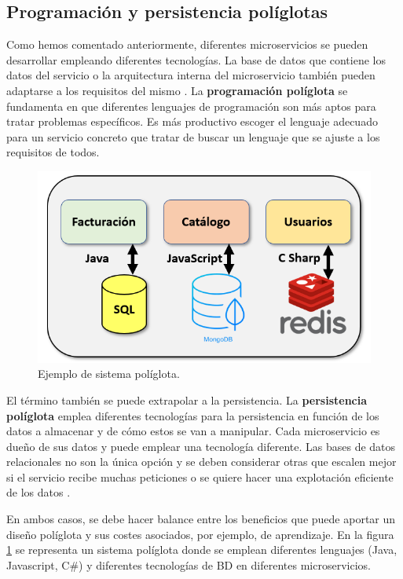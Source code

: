 \documentclass[11pt,spanish,listoffigures]{tfgetsinf}
\begin{document}
\subsection{Programación y persistencia políglotas} \label{subsec:Poliglota}

Como hemos comentado anteriormente, diferentes microservicios se pueden desarrollar empleando diferentes tecnologías. La base de datos que contiene los datos del servicio o la arquitectura interna del microservicio también pueden adaptarse a los requisitos del mismo \cite{DelaTorre2018}. La \textbf{programación políglota} se fundamenta en que diferentes lenguajes de programación son más aptos para tratar problemas específicos. Es más productivo escoger el lenguaje adecuado para un servicio concreto que tratar de buscar un lenguaje que se ajuste a los requisitos de todos.

\begin{figure}[h]
\centering
\includegraphics[scale=0.65]{poliglota}
\caption{Ejemplo de sistema políglota.}
\label{fig:poliglota}
\end{figure}

El término también se puede extrapolar a la persistencia. La \textbf{persistencia políglota} emplea diferentes tecnologías para la persistencia en función de los datos a almacenar y de cómo estos se van a manipular. Cada microservicio es dueño de sus datos y puede emplear una tecnología diferente. Las bases de datos relacionales no son la única opción y se deben considerar otras que escalen mejor si el servicio recibe muchas peticiones o se quiere hacer una explotación eficiente de los datos \cite{Fowler2011}.

En ambos casos, se debe hacer balance entre los beneficios que puede aportar un diseño políglota y sus costes asociados, por ejemplo, de aprendizaje. En la figura \ref{fig:poliglota} se representa un sistema políglota donde se emplean diferentes lenguajes (Java, Javascript, C\#) y diferentes tecnologías de BD en diferentes microservicios.
\end{document}
